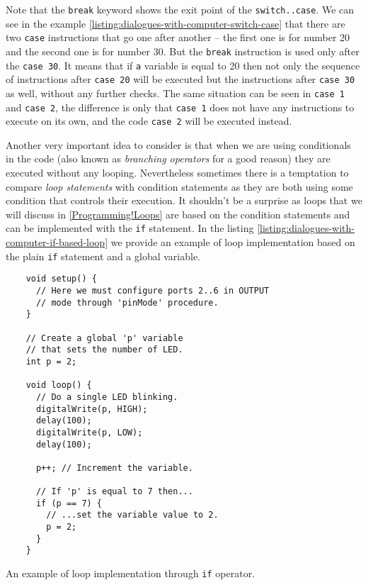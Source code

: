 \documentclass[../sparc.tex]{subfiles}
\begin{document}
Note that the \texttt{break} keyword shows the exit point of the
\texttt{switch..case}.  We can see in the example
\ref{listing:dialogues-with-computer-switch-case} that there are two
\texttt{case} instructions that go one after another -- the first one is for
number 20 and the second one is for number 30.  But the \texttt{break}
instruction is used only after the \texttt{case 30}.  It means that if
\texttt{a} variable is equal to 20 then not only the sequence of instructions
after \texttt{case 20} will be executed but the instructions after \texttt{case
  30} as well, without any further checks.  The same situation can be seen in
\texttt{case 1} and \texttt{case 2}, the difference is only that \texttt{case 1}
does not have any instructions to execute on its own, and the code \texttt{case
  2} will be executed instead.

Another very important idea to consider is that when we are using conditionals
in the code (also known as \emph{branching operators} for a good reason) they
are executed without any looping.  Nevertheless sometimes there is a temptation
to compare \emph{loop statements} with condition statements as they are both
using some condition that controls their execution.  It shouldn't be a surprise
as loops that we will discuss in \ref{Programming!Loops} are based on the
condition statements and can be implemented with the \texttt{if} statement.  In
the listing \ref{listing:dialogues-with-computer-if-based-loop} we provide an
example of loop implementation based on the plain \texttt{if} statement and a
global variable.

\begin{listing}[ht]
  \begin{verbatim}
    void setup() {
      // Here we must configure ports 2..6 in OUTPUT
      // mode through 'pinMode' procedure.
    }

    // Create a global 'p' variable
    // that sets the number of LED.
    int p = 2;

    void loop() {
      // Do a single LED blinking.
      digitalWrite(p, HIGH);
      delay(100);
      digitalWrite(p, LOW);
      delay(100);

      p++; // Increment the variable.

      // If 'p' is equal to 7 then...
      if (p == 7) {
        // ...set the variable value to 2.
        p = 2;
      }
    }
  \end{verbatim}
  \label{listing:dialogues-with-computer-if-based-loop}
  \caption{An example of loop implementation through \texttt{if} operator.}
\end{listing}
\end{document}
